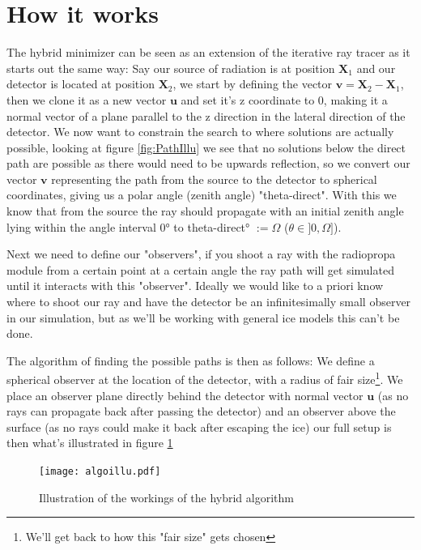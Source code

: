 \section{How it works}
The hybrid minimizer can be seen as an extension of the iterative ray tracer as
it starts out the same way: Say our source of radiation is at position
$\mathbf{X}_1$ and our detector is located at position $\mathbf{X}_2$, we start
by defining the vector $\mathbf{v} = \mathbf{X}_2 - \mathbf{X}_1$, then we
clone it as a new vector $\mathbf{u}$ and set it's z coordinate to 0, making it a normal
vector of a plane parallel to the z direction in the lateral direction of the detector. 
We now want to constrain the search to where solutions are actually possible, 
looking at figure \ref{fig:PathIllu}
we see that no solutions below the direct path are possible as there would need
to be upwards reflection, so we convert our vector $\mathbf{v}$ representing
the path from the source to the detector to spherical coordinates, giving us a
polar angle (zenith angle) "theta-direct". With this we know that from the source
the ray should propagate with an initial zenith angle lying within the angle interval
0° to theta-direct° $:= \Omega$ ($\theta \in ]0,\Omega]$).

Next we need to define our "observers", if you shoot a ray with the radiopropa
module from a certain point at a certain angle the ray path will get simulated
until it interacts with this "observer".  Ideally we would like to a priori
know where to shoot our ray and have the detector be an infinitesimally small
observer in our simulation, but as we'll be working with general ice models
this can't be done.

The algorithm of finding the possible paths is then as follows: We define a
spherical observer at the location of the detector, with a radius of fair
size\footnote{We'll get back to how this "fair size" gets chosen}.  We place an observer plane directly
behind the detector with normal vector $\mathbf{u}$ (as no rays can propagate
back after passing the detector) and an observer above the surface (as no rays
could make it back after escaping the ice) our full setup is then what's
illustrated in figure \ref{fig:Illustration of hybrid algorithm}

\begin{figure}
  \centering
  \texttt{[image: algoillu.pdf]}
  \caption{Illustration of the workings of the hybrid algorithm}
  \label{fig:Illustration of hybrid algorithm}
\end{figure}

